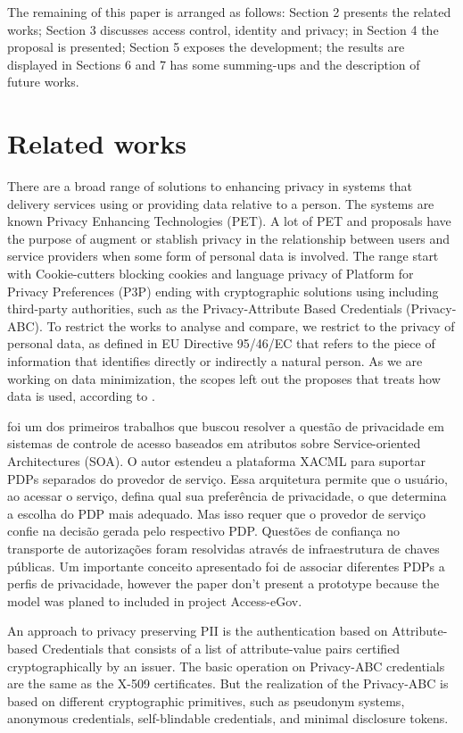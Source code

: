 \documentclass{doublecol-new}
\begin{document}
The remaining of this paper is arranged as follows: Section 2 presents the related works; Section 3 discusses access control, identity and privacy; in Section 4 the proposal is presented; Section 5 exposes the development; the results are displayed in Sections 6 and 7 has some summing-ups and the description of future works.

\section{Related works}
There are a broad range of solutions to enhancing privacy in systems that delivery services using or providing data relative to a person. The systems are known Privacy Enhancing Technologies (PET). A lot of PET and proposals have the purpose of augment or stablish privacy in the relationship between users and service providers when some form of personal data is involved. The range start with Cookie-cutters blocking cookies and language privacy of Platform for Privacy Preferences (P3P) ending with cryptographic solutions using including third-party authorities, such as the Privacy-Attribute Based Credentials (Privacy-ABC). To restrict the works to analyse and compare, we restrict to the privacy of personal data, as defined in EU Directive 95/46/EC\citep{directive199595} that refers to the piece of information that identifies directly or indirectly a natural person. As we are working on data minimization, the scopes left out the proposes that treats how data is used, according to \cite{mondal2014beyond}.

\cite{kolter2007privacy} foi um dos primeiros trabalhos que buscou resolver a questão de privacidade em sistemas de controle de acesso baseados em atributos sobre Service-oriented Architectures (SOA). O autor estendeu a plataforma XACML para suportar PDPs separados do provedor de serviço. Essa arquitetura permite que o usuário, ao acessar o serviço, defina qual sua preferência de privacidade, o que determina a escolha do PDP mais adequado. Mas isso requer que o provedor de serviço confie na decisão gerada pelo respectivo PDP. Questões de confiança no transporte de autorizações foram resolvidas através de infraestrutura de chaves públicas. Um importante conceito apresentado foi de associar diferentes PDPs a perfis de privacidade, however the paper don't present a prototype because the model was planed to included in project Access-eGov\cite{pernulAccesseGov}.

An approach to privacy preserving PII is the authentication based on Attribute-based Credentials that consists of a list of attribute-value pairs certified cryptographically by an issuer. The basic operation on Privacy-ABC credentials are the same as the X-509 certificates. But the realization of the Privacy-ABC is based on different cryptographic primitives, such as pseudonym systems\citep{chaum1981untraceable}, anonymous credentials\citep{camenisch2001efficient}, self-blindable credentials\citep{verheul2001self}, and minimal disclosure tokens\citep{brands2000rethinking}.
\end{document}
